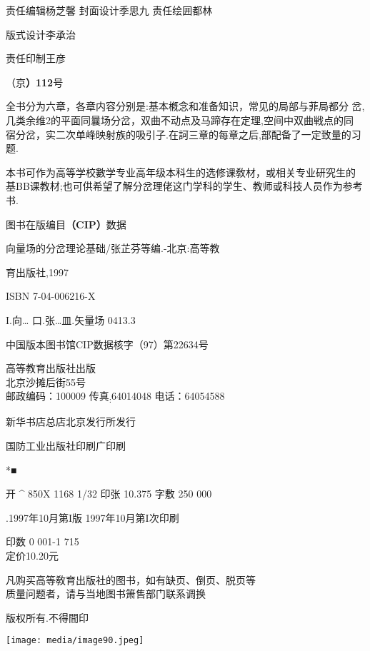 责任编辑杨芝馨 封面设计季思九 责任绘囲都林

版式设计李承治

责任印制王彦

（京\textbf{）112}号

全书分为六章，各章内容分别是:基本槪念和准备知识，常见的局部与菲局都分
岔,几类余维2的平面同曩场分岔，双曲不动点及马蹄存在定理,空间中双曲戦点的同
宿分岔，实二次单峰映射族的吸引子.在訶三章的每章之后,部配备了一定致量的习
题.

本书可作为高等学校數学专业高年级本科生的选修课敎材，或相关专业研究生的
基BB课教材;也可供希望了解分岔理佬这门学科的学生、教师或科技人员作为参考书.

图书在版编目\textbf{（CIP）}数据

向量场的分岔理论基础/张芷芬等编.-北京:高等教

育出版社,1997

ISBN 7-04-006216-X

I.向\ldots{} 口.张\ldots{}皿.矢量场 0413.3

中国版本图书馆CIP数据核字（97）第22634号

高等教育出版社出版\\
北京沙摊后街55号\\
邮政编码：100009 传真\textsubscript{:}64014048 电话：64054588

新华书店总店北京发行所发行

国防工业出版社印刷广印刷

*■

开 \^{} 850X 1168 1/32 印张 10.375 字敷 250 000

.1997年10月第I版 1997年10月第I次印刷

印数 0 001-1 715\\
定价10.20元

凡购买高等敎育出版社的图书，如有缺页、倒页、脱页等\\
质量问题者，请与当地图书箫售部门联系调换

版权所有.不得間印

\texttt{[image: media/image90.jpeg]}



